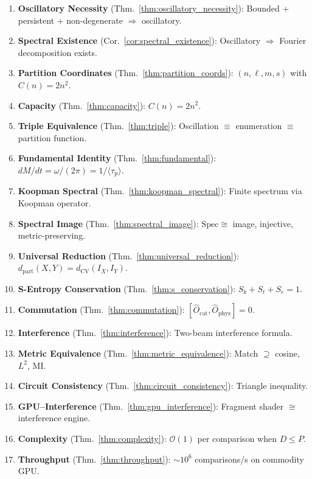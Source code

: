 \documentclass[11pt,twocolumn,a4paper]{article}
\newcommand{\Ocat}{\hat{O}_{\mathrm{cat}}}
\newcommand{\Ophys}{\hat{O}_{\mathrm{phys}}}
\newcommand{\Sk}{S_k}
\newcommand{\St}{S_t}
\newcommand{\Se}{S_e}
\newcommand{\BigO}{\mathcal{O}}
\newcommand{\taup}{\tau_{\mathrm{p}}}
\newcommand{\Spec}{\mathrm{Spec}}
\begin{document}
\begin{enumerate}[nosep]
  \item \textbf{Oscillatory Necessity} (Thm.~\ref{thm:oscillatory_necessity}):
    Bounded + persistent + non-degenerate $\Rightarrow$ oscillatory.
  \item \textbf{Spectral Existence} (Cor.~\ref{cor:spectral_existence}):
    Oscillatory $\Rightarrow$ Fourier decomposition exists.
  \item \textbf{Partition Coordinates} (Thm.~\ref{thm:partition_coords}):
    $(n, \ell, m, s)$ with $C(n) = 2n^2$.
  \item \textbf{Capacity} (Thm.~\ref{thm:capacity}): $C(n) = 2n^2$.
  \item \textbf{Triple Equivalence} (Thm.~\ref{thm:triple}):
    Oscillation $\equiv$ enumeration $\equiv$ partition function.
  \item \textbf{Fundamental Identity} (Thm.~\ref{thm:fundamental}):
    $dM/dt = \omega/(2\pi) = 1/\langle\taup\rangle$.
  \item \textbf{Koopman Spectral} (Thm.~\ref{thm:koopman_spectral}):
    Finite spectrum via Koopman operator.
  \item \textbf{Spectral Image} (Thm.~\ref{thm:spectral_image}):
    $\Spec \cong$ image, injective, metric-preserving.
  \item \textbf{Universal Reduction} (Thm.~\ref{thm:universal_reduction}):
    $d_{\mathrm{part}}(X,Y) = d_{\mathrm{CV}}(I_X, I_Y)$.
  \item \textbf{S-Entropy Conservation} (Thm.~\ref{thm:s_conservation}):
    $\Sk + \St + \Se = 1$.
  \item \textbf{Commutation} (Thm.~\ref{thm:commutation}):
    $[\Ocat, \Ophys] = 0$.
  \item \textbf{Interference} (Thm.~\ref{thm:interference}):
    Two-beam interference formula.
  \item \textbf{Metric Equivalence} (Thm.~\ref{thm:metric_equivalence}):
    Match $\supseteq$ cosine, $L^2$, MI.
  \item \textbf{Circuit Consistency} (Thm.~\ref{thm:circuit_consistency}):
    Triangle inequality.
  \item \textbf{GPU--Interference} (Thm.~\ref{thm:gpu_interference}):
    Fragment shader $\cong$ interference engine.
  \item \textbf{Complexity} (Thm.~\ref{thm:complexity}):
    $\BigO(1)$ per comparison when $D \leq P$.
  \item \textbf{Throughput} (Thm.~\ref{thm:throughput}):
    $\sim 10^6$ comparisons/s on commodity GPU.
\end{enumerate}




\end{document}
